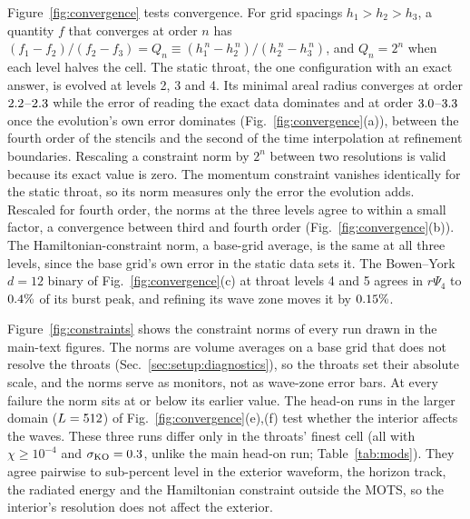\documentclass[twocolumn,floatfix,aps,prd,superscriptaddress,nofootinbib]{revtex4-2}
\begin{document}
Figure~\ref{fig:convergence} tests convergence. For grid spacings $h_1>h_2>h_3$, a quantity $f$ that converges at order $n$ has $(f_1-f_2)/(f_2-f_3)=Q_n\equiv(h_1^{\,n}-h_2^{\,n})/(h_2^{\,n}-h_3^{\,n})$, and $Q_n=2^n$ when each level halves the cell. The static throat, the one configuration with an exact answer, is evolved at levels 2, 3 and 4. Its minimal areal radius converges at order $2.2$--$2.3$ while the error of reading the exact data dominates and at order $3.0$--$3.3$ once the evolution's own error dominates (Fig.~\ref{fig:convergence}(a)), between the fourth order of the stencils and the second of the time interpolation at refinement boundaries. Rescaling a constraint norm by $2^n$ between two resolutions is valid because its exact value is zero. The momentum constraint vanishes identically for the static throat, so its norm measures only the error the evolution adds. Rescaled for fourth order, the norms at the three levels agree to within a small factor, a convergence between third and fourth order (Fig.~\ref{fig:convergence}(b)). The Hamiltonian-constraint norm, a base-grid average, is the same at all three levels, since the base grid's own error in the static data sets it. The Bowen--York $d=12$ binary of Fig.~\ref{fig:convergence}(c) at throat levels 4 and 5 agrees in $r\Psi_4$ to $0.4\%$ of its burst peak, and refining its wave zone moves it by $0.15\%$.

Figure~\ref{fig:constraints} shows the constraint norms of every run drawn in the main-text figures. The norms are volume averages on a base grid that does not resolve the throats (Sec.~\ref{sec:setup:diagnostics}), so the throats set their absolute scale, and the norms serve as monitors, not as wave-zone error bars. At every failure the norm sits at or below its earlier value. The head-on runs in the larger domain ($L=512$) of Fig.~\ref{fig:convergence}(e),(f) test whether the interior affects the waves. These three runs differ only in the throats' finest cell (all with $\chi\ge10^{-4}$ and $\sigma_{\rm KO}=0.3$, unlike the main head-on run; Table~\ref{tab:mods}). They agree pairwise to sub-percent level in the exterior waveform, the horizon track, the radiated energy and the Hamiltonian constraint outside the MOTS, so the interior's resolution does not affect the exterior.
\end{document}

